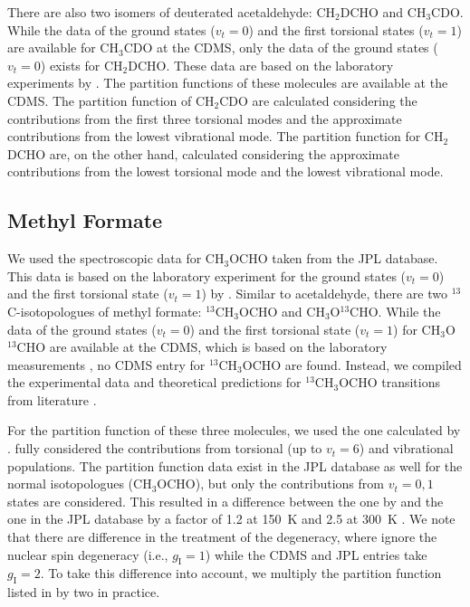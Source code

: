 \documentclass[linenumbers, twocolumn, twocolappendix, astrosymb, times]{aastex631}
\newcommand{\methylformate}{CH$_3$OCHO\xspace}
\begin{document}
There are also two isomers of deuterated acetaldehyde: CH$_2$DCHO and CH$_3$CDO. While the data of the ground states ($v_t = 0$) and the first torsional states ($v_t = 1$) are available for CH$_3$CDO at the CDMS, only the data of the ground states ($v_t = 0$) exists for CH$_2$DCHO. These data are based on the laboratory experiments by \citet{Coudert2019}. The partition functions of these molecules are available at the CDMS. The partition function of CH$_2$CDO are calculated considering the contributions from the first three torsional modes and the approximate contributions from the lowest vibrational mode. The partition function for CH$_2$DCHO are, on the other hand, calculated considering the approximate contributions from the lowest torsional mode and the lowest vibrational mode.


\subsection{Methyl Formate}
We used the spectroscopic data for \methylformate taken from the JPL database. This data is based on the laboratory experiment for the ground states ($v_t = 0$) and the first torsional state ($v_t = 1$) by \citet{Ilyushin2009}. Similar to acetaldehyde, there are two $^{13}$C-isotopologues of methyl formate: $^{13}$CH$_3$OCHO and CH$_3$O$^{13}$CHO. While the data of the ground states ($v_t = 0$) and the first torsional state ($v_t = 1$) for CH$_3$O$^{13}$CHO are available at the CDMS, which is based on the laboratory measurements \citep[][and references therein]{Carvajal2010}, no CDMS entry for $^{13}$CH$_3$OCHO are found. Instead, we compiled the experimental data and theoretical predictions for $^{13}$CH$_3$OCHO transitions from literature \citep{Carvajal2009, Haykal2014, Favre2014}. 

For the partition function of these three molecules, we used the one calculated by \citet{Favre2014}. \citet{Favre2014} fully considered the contributions from torsional (up to $v_t=6$) and vibrational populations. The partition function data exist in the JPL database as well for the normal isotopologues (\methylformate), but only the contributions from $v_t = 0, 1$ states are considered. This resulted in a difference between the one by \citet{Favre2014} and the one in the JPL database by a factor of 1.2 at 150~K and 2.5 at 300~K \citep{Favre2014}. We note that there are difference in the treatment of the degeneracy, where \citet{Favre2014} ignore the nuclear spin degeneracy (i.e., $g_\mathrm{I} = 1$) while the CDMS and JPL entries take $g_\mathrm{I} = 2$. To take this difference into account, we multiply the partition function listed in \citet{Favre2014} by two in practice.
\end{document}
